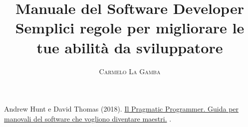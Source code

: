 \documentclass[twoside,onecolumn]{article}
\title{Manuale del Software Developer \\ \large Semplici regole per migliorare le tue abilità da sviluppatore}
\author{
	\textsc{Carmelo La Gamba}\\[1ex]
	\normalsize
	\href{https://carmelolg.github.io/}{\faicon{github}}%
	\hspace{0.75em}%
	\href{https://t.me/carmelolg}{\faicon{paper-plane}}
}
\date{} %
\begin{document}
\maketitle


\newpage


\newpage


\newpage



\newpage


\begin{thebibliography}{99} %

Andrew Hunt e David Thomas (2018).
\newblock \href{https://www.amazon.it/dp/8850332548/ref=cm_sw_em_r_mt_dp_AvYCFbNVMFA1X}{Il Pragmatic Programmer. Guida per manovali del software che vogliono diventare maestri.}
.
 
\end{thebibliography}

\end{document}
